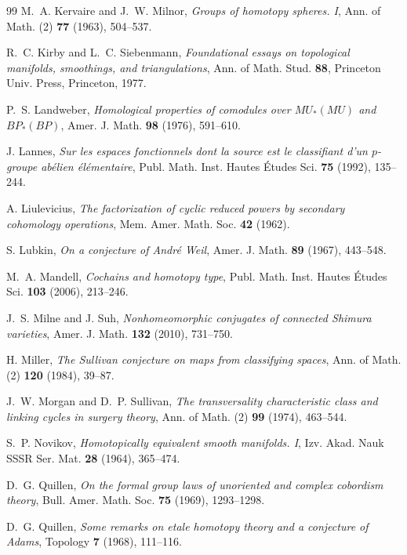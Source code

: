 \documentclass[11pt]{amsart}
\theoremstyle{plain}
\theoremstyle{definition}
\numberwithin{equation}{section}
\begin{document}
\begin{thebibliography}{99}
M.~A. Kervaire and J.~W. Milnor, \emph{Groups of homotopy spheres. I}, Ann. of Math. (2) \textbf{77} (1963), 504--537.

R.~C. Kirby and L.~C. Siebenmann, \emph{Foundational essays on topological manifolds, smoothings, and triangulations}, Ann. of Math. Stud. \textbf{88}, Princeton Univ. Press, Princeton, 1977.

P.~S. Landweber, \emph{Homological properties of comodules over $MU_*(MU)$ and $BP_*(BP)$}, Amer. J. Math. \textbf{98} (1976), 591--610.

J. Lannes, \emph{Sur les espaces fonctionnels dont la source est le classifiant d'un $p$-groupe ab\'elien \'el\'ementaire}, Publ. Math. Inst. Hautes \'Etudes Sci. \textbf{75} (1992), 135--244.

A. Liulevicius, \emph{The factorization of cyclic reduced powers by secondary cohomology operations}, Mem. Amer. Math. Soc. \textbf{42} (1962).

S. Lubkin, \emph{On a conjecture of Andr\'e Weil}, Amer. J. Math. \textbf{89} (1967), 443--548.

M.~A. Mandell, \emph{Cochains and homotopy type}, Publ. Math. Inst. Hautes \'Etudes Sci. \textbf{103} (2006), 213--246.

J.~S. Milne and J. Suh, \emph{Nonhomeomorphic conjugates of connected Shimura varieties}, Amer. J. Math. \textbf{132} (2010), 731--750.

H. Miller, \emph{The Sullivan conjecture on maps from classifying spaces}, Ann. of Math. (2) \textbf{120} (1984), 39--87.

J.~W. Morgan and D.~P. Sullivan, \emph{The transversality characteristic class and linking cycles in surgery theory}, Ann. of Math. (2) \textbf{99} (1974), 463--544.

S.~P. Novikov, \emph{Homotopically equivalent smooth manifolds. I}, Izv. Akad. Nauk SSSR Ser. Mat. \textbf{28} (1964), 365--474.

D.~G. Quillen, \emph{On the formal group laws of unoriented and complex cobordism theory}, Bull. Amer. Math. Soc. \textbf{75} (1969), 1293--1298.

D.~G. Quillen, \emph{Some remarks on etale homotopy theory and a conjecture of Adams}, Topology \textbf{7} (1968), 111--116.


\end{thebibliography}
\end{document}
